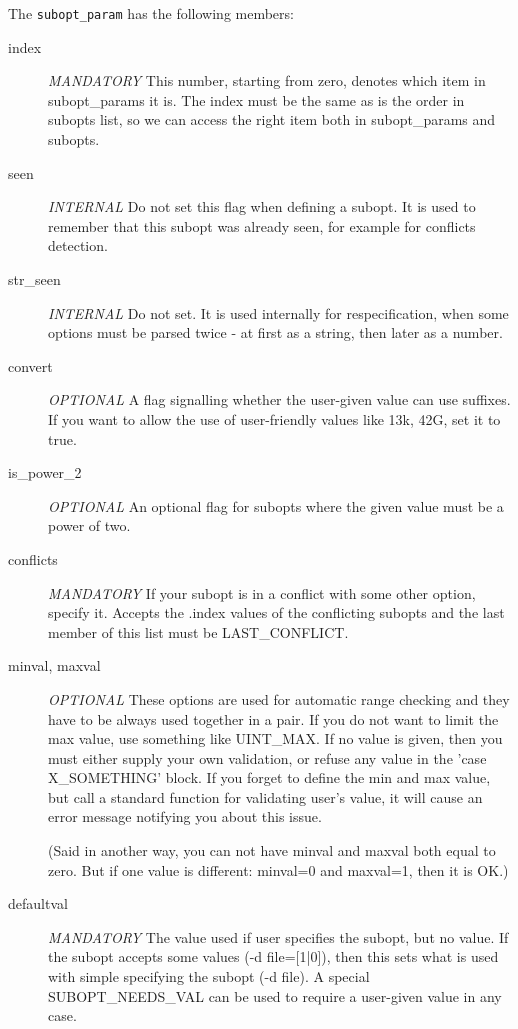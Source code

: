 The {\tt subopt\_param} has the following members:
\begin{description}
\item[index] {\em MANDATORY}
    This number, starting from zero, denotes which item in subopt\_params
    it is. The index must be the same as is the order in subopts list,
    so we can access the right item both in subopt\_params and subopts.

\item[seen] {\em INTERNAL}
    Do not set this flag when defining a subopt. It is used to remember that
    this subopt was already seen, for example for conflicts detection.

\item[str\_seen] {\em INTERNAL}
    Do not set. It is used internally for respecification, when some options
    must be parsed twice - at first as a string, then later as a number.

\item[convert] {\em OPTIONAL}
    A flag signalling whether the user-given value can use suffixes.
    If you want to allow the use of user-friendly values like 13k, 42G,
    set it to true.

\item[is\_power\_2] {\em OPTIONAL}
    An optional flag for subopts where the given value must be a power
    of two.

\item[conflicts] {\em MANDATORY}
    If your subopt is in a conflict with some other option, specify it.
    Accepts the .index values of the conflicting subopts and the last
    member of this list must be LAST\_CONFLICT.

\item[minval, maxval] {\em OPTIONAL}
    These options are used for automatic range checking and they have to be
    always used together in a pair. If you do not want to limit the max value,
    use something like UINT\_MAX. If no value is given, then you must either
    supply your own validation, or refuse any value in the 'case
    X\_SOMETHING' block. If you forget to define the min and max value, but
    call a standard function for validating user's value, it will cause an
    error message notifying you about this issue.

    (Said in another way, you can not have minval and maxval both equal
    to zero. But if one value is different: minval=0 and maxval=1,
    then it is OK.)

\item[defaultval] {\em MANDATORY}
    The value used if user specifies the subopt, but no value.
    If the subopt accepts some values (-d file=[1|0]), then this
    sets what is used with simple specifying the subopt (-d file).
    A special SUBOPT\_NEEDS\_VAL can be used to require a user-given
    value in any case.


\end{description}
